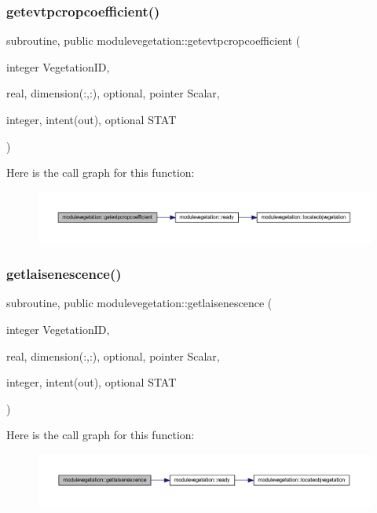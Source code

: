 \subsubsection{\texorpdfstring{getevtpcropcoefficient()}{getevtpcropcoefficient()}}
{\footnotesize\ttfamily subroutine, public modulevegetation\+::getevtpcropcoefficient (\begin{DoxyParamCaption}\item[{integer}]{Vegetation\+ID,  }\item[{real, dimension(\+:,\+:), optional, pointer}]{Scalar,  }\item[{integer, intent(out), optional}]{S\+T\+AT }\end{DoxyParamCaption})}

Here is the call graph for this function\+:\nopagebreak
\begin{figure}[H]
\begin{center}
\leavevmode
\includegraphics[width=350pt]{namespacemodulevegetation_ac3fe071c0a204afbed0b3414ecb4e09d_cgraph}
\end{center}
\end{figure}
\mbox{\label{namespacemodulevegetation_a91f1942c40129d70091dd872f5f926ae}} 
\subsubsection{\texorpdfstring{getlaisenescence()}{getlaisenescence()}}
{\footnotesize\ttfamily subroutine, public modulevegetation\+::getlaisenescence (\begin{DoxyParamCaption}\item[{integer}]{Vegetation\+ID,  }\item[{real, dimension(\+:,\+:), optional, pointer}]{Scalar,  }\item[{integer, intent(out), optional}]{S\+T\+AT }\end{DoxyParamCaption})}

Here is the call graph for this function\+:\nopagebreak
\begin{figure}[H]
\begin{center}
\leavevmode
\includegraphics[width=350pt]{namespacemodulevegetation_a91f1942c40129d70091dd872f5f926ae_cgraph}
\end{center}
\end{figure}
\mbox{\label{namespacemodulevegetation_acf7940a010ec79861c9eaee61e66b333}} 
